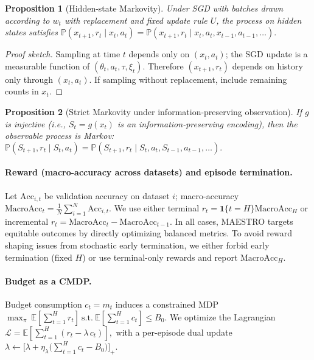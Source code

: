 \documentclass[11pt]{article}
\newtheorem{proposition}{Proposition}
\newcommand{\MacroAcc}{\mathrm{MacroAcc}}
\newcommand{\E}{\mathbb{E}}
\newcommand{\1}{\mathbf{1}}
\newcommand{\Prb}{\mathbb{P}}
\newcommand{\MAESTRO}{\textsc{MAESTRO}\xspace}
\begin{document}
\begin{proposition}[Hidden-state Markovity]
Under SGD with batches drawn according to $w_t$ \emph{with replacement} and fixed update rule $U$, the process on hidden states satisfies
\(
\Prb(x_{t+1},r_t \mid x_t,a_t)=\Prb(x_{t+1},r_t \mid x_t,a_t,x_{t-1},a_{t-1},\dots).
\)
\end{proposition}
\begin{proof}[Proof sketch]
Sampling at time $t$ depends only on $(x_t,a_t)$; the SGD update is a measurable function of $(\theta_t,a_t,\tau,\xi_t)$.
Therefore $(x_{t+1},r_t)$ depends on history only through $(x_t,a_t)$.
If sampling without replacement, include remaining counts in $x_t$.
\end{proof}

\begin{proposition}[Strict Markovity under information-preserving observation]\label{prop:inject}
If $g$ is injective (i.e., $S_t=g(x_t)$ is an information-preserving encoding), then the observable process is Markov:
\(
\Prb(S_{t+1},r_t \mid S_t,a_t)=\Prb(S_{t+1},r_t \mid S_t,a_t,S_{t-1},a_{t-1},\dots).
\)
\end{proposition}

\paragraph{Reward (macro-accuracy across datasets) and episode termination.}
Let $\mathrm{Acc}_{i,t}$ be validation accuracy on dataset $i$; macro-accuracy $\MacroAcc_t=\frac{1}{N}\sum_{i=1}^N \mathrm{Acc}_{i,t}$.
We use either terminal $r_t=\1\{t=H\}\MacroAcc_H$ or incremental $r_t=\MacroAcc_t-\MacroAcc_{t-1}$. In all cases, \MAESTRO{} targets equitable outcomes by directly optimizing balanced metrics.
To avoid reward shaping issues from stochastic early termination, we either forbid early termination (fixed $H$) or use terminal-only rewards and report $\MacroAcc_H$.

\paragraph{Budget as a CMDP.}
Budget consumption $c_t=m_t$ induces a constrained MDP
\(
\max_\pi \ \E[\sum_{t=1}^H r_t]\ \text{s.t.}\ \E[\sum_{t=1}^H c_t]\le B_0.
\)
We optimize the Lagrangian
\(
\mathcal{L}=\E\!\left[\sum_{t=1}^H (r_t-\lambda\,c_t)\right],
\)
with a per-episode dual update
\(
\lambda \leftarrow \big[\lambda + \eta_\lambda\big(\sum_{t=1}^H c_t - B_0\big)\big]_+.
\)
\end{document}
